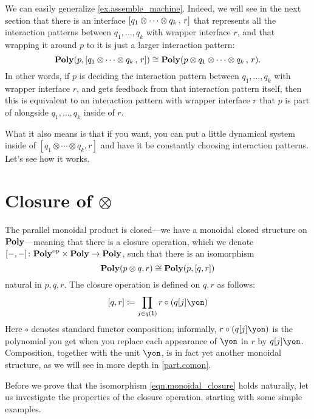 \documentclass[Book-Poly]{subfiles}
\begin{document}
We can easily generalize \cref{ex.assemble_machine}.
Indeed, we will see in the next section that there is an interface $[q_1\otimes\cdots\otimes q_k\,,\,r]$ that represents all the interaction patterns between $q_1,\ldots,q_k$ with wrapper interface $r$, and that wrapping it around $p$ to it is just a larger interaction pattern:
\[
\mathbf{Poly}(p,[q_1\otimes\cdots\otimes q_k\,,\,r])\cong\mathbf{Poly}(p\otimes q_1\otimes\cdots\otimes q_k\,,\,r).
\]
In other words, if $p$ is deciding the interaction pattern between $q_1,\ldots,q_k$ with wrapper interface $r$, and gets feedback from that interaction pattern itself, then this is equivalent to an interaction pattern with wrapper interface $r$ that $p$ is part of alongside $q_1,\ldots,q_k$ inside of $r$.

What it also means is that if you want, you can put a little dynamical system inside of $[q_1\otimes\cdots\otimes q_k,r]$ and have it be constantly choosing interaction patterns. Let's see how it works.


\section{Closure of $\otimes$}\label{sec.closure}%

The parallel monoidal product is closed---we have a monoidal closed structure on $\mathbf{Poly}$---meaning that there is a closure operation, which we denote $[-,-]\colon\mathbf{Poly}^{\textnormal{op}}\times\mathbf{Poly}\to\mathbf{Poly}$, such that there is an isomorphism
\begin{equation}\label{eqn.monoidal_closure}
  \mathbf{Poly}(p\otimes q,r) \cong \mathbf{Poly}(p,[q,r])
\end{equation}
natural in $p,q,r$.
The closure operation is defined on $q,r$ as follows:
\begin{equation}\label{eqn.par_hom}
	\ihom{q,r} \coloneqq \prod_{j\in q(\1)}r\circ(q[j]\yon)
\end{equation}
Here $\circ$ denotes standard functor composition; informally, $r \circ (q[j]\yon)$ is the polynomial you get when you replace each appearance of $\yon$ in $r$ by $q[j]\yon$.
Composition, together with the unit $\yon$, is in fact yet another monoidal structure, as we will see in more depth in \cref{part.comon}.

Before we prove that the isomorphism \eqref{eqn.monoidal_closure} holds naturally, let us investigate the properties of the closure operation, starting with some simple examples.
\end{document}
